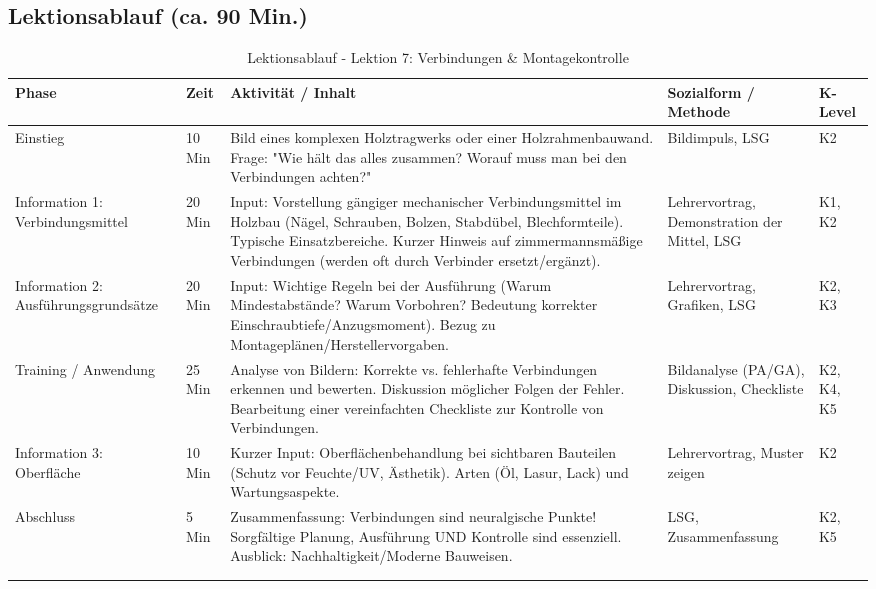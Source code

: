 \documentclass[12pt, a4paper]{article}
\begin{document}
\subsection{Lektionsablauf (ca. 90 Min.)}
\begin{longtable}{|p{}|p{}|>{\raggedright\arraybackslash}p{}|p{}|p{}|}
    \hline
    \textbf{Phase} & \textbf{Zeit} & \textbf{Aktivität / Inhalt} & \textbf{Sozialform / Methode} & \textbf{K-Level} \\
    \hline
    \endhead

    Einstieg & 10 Min & Bild eines komplexen Holztragwerks oder einer Holzrahmenbauwand. Frage: "Wie hält das alles zusammen? Worauf muss man bei den Verbindungen achten?" & Bildimpuls, LSG & K2 \\
    \hline
    Information 1: Verbindungsmittel & 20 Min & Input: Vorstellung gängiger mechanischer Verbindungsmittel im Holzbau (Nägel, Schrauben, Bolzen, Stabdübel, Blechformteile). Typische Einsatzbereiche. Kurzer Hinweis auf zimmermannsmäßige Verbindungen (werden oft durch Verbinder ersetzt/ergänzt). & Lehrervortrag, Demonstration der Mittel, LSG & K1, K2 \\
    \hline
    Information 2: Ausführungsgrundsätze & 20 Min & Input: Wichtige Regeln bei der Ausführung (Warum Mindestabstände? Warum Vorbohren? Bedeutung korrekter Einschraubtiefe/Anzugsmoment). Bezug zu Montageplänen/Herstellervorgaben. & Lehrervortrag, Grafiken, LSG & K2, K3 \\
    \hline
    Training / Anwendung & 25 Min & Analyse von Bildern: Korrekte vs. fehlerhafte Verbindungen erkennen und bewerten. Diskussion möglicher Folgen der Fehler. Bearbeitung einer vereinfachten Checkliste zur Kontrolle von Verbindungen. & Bildanalyse (PA/GA), Diskussion, Checkliste & K2, K4, K5 \\
    \hline
    Information 3: Oberfläche & 10 Min & Kurzer Input: Oberflächenbehandlung bei sichtbaren Bauteilen (Schutz vor Feuchte/UV, Ästhetik). Arten (Öl, Lasur, Lack) und Wartungsaspekte. & Lehrervortrag, Muster zeigen & K2 \\
    \hline
    Abschluss & 5 Min & Zusammenfassung: Verbindungen sind neuralgische Punkte! Sorgfältige Planung, Ausführung UND Kontrolle sind essenziell. Ausblick: Nachhaltigkeit/Moderne Bauweisen. & LSG, Zusammenfassung & K2, K5 \\
    \hline
    \caption{Lektionsablauf - Lektion 7: Verbindungen \& Montagekontrolle} \\
    \label{tab:lektion7-bf}
\end{longtable}
\end{document}
